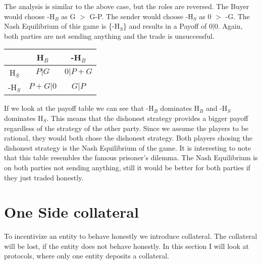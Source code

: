 \documentclass{cacthesis}
\begin{document}
\newline
The analysis is similar to the above case, but the roles are reversed. The Buyer would choose -H$_B$ as G $>$ G-P.\newline
The sender would choose -H$_S$ as 0 $>$ -G.\newline
The Nash Equilibrium of this game is \{-H$_S$\} and results in a Payoff of $0|0$. Again, both parties are not sending anything and the trade is unsuccessful.



\begin{center}
\begin{tabular}{ c||c|c| }
& H$_B$ & -H$_B$  \\
\hline
\hline
H$_S$ & $P | G$ & $0 | P+G$ \\
\hline
-H$_S$ & $P + G | 0$ & $G | P$ \\ 
\hline
\end{tabular}
\end{center}

If we look at the payoff table we can see that -H$_B$ dominates H$_B$ and -H$_S$ dominates H$_S$. This means that the dishonest strategy provides a bigger payoff regardless of the strategy of the other party. \newline
Since we assume the players to be rational, they would both chose the dishonest strategy. Both players chosing the dishonest strategy is the Nash Equilibrium of the game.\newline
It is interesting to note that this table resembles the famous prisoner's dilemma.
The Nash Equilibrium is on both parties not sending anything, still it would be better for both parties if they just traded honestly. 

\section{One Side collateral}
To incentivize an entity to behave honestly we introduce collateral. The collateral will be lost, if the entity does not behave honestly. In this section I will look at protocols, where only one entity deposits a collateral.
\end{document}
